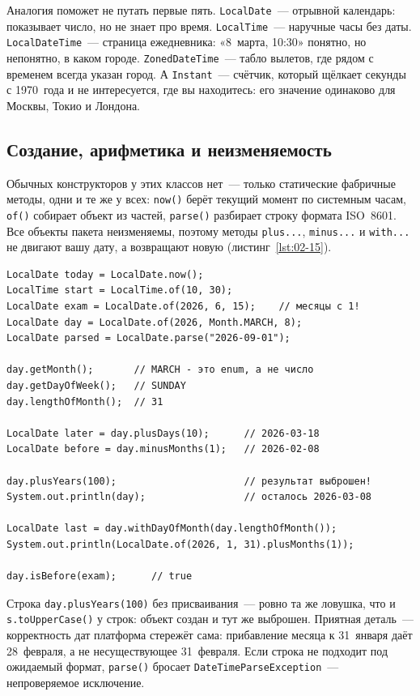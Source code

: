 Аналогия поможет не путать первые пять. \texttt{LocalDate}~--- отрывной
календарь: показывает число, но не знает про время. \texttt{LocalTime}~---
наручные часы без даты. \texttt{LocalDateTime}~--- страница ежедневника:
«8~марта, 10:30» понятно, но непонятно, в каком городе.
\texttt{ZonedDateTime}~--- табло вылетов, где рядом с временем всегда указан
город. А \texttt{Instant}~--- счётчик, который щёлкает секунды с 1970~года и
не интересуется, где вы находитесь: его значение одинаково для Москвы, Токио
и Лондона.

\subsection{Создание, арифметика и неизменяемость}

Обычных конструкторов у этих классов нет~--- только статические фабричные
методы, одни и те же у всех: \texttt{now()} берёт текущий момент по системным
часам, \texttt{of()} собирает объект из частей, \texttt{parse()} разбирает
строку формата ISO~8601. Все объекты пакета неизменяемы, поэтому методы
\texttt{plus...}, \texttt{minus...} и \texttt{with...} не двигают вашу дату,
а возвращают новую (листинг~\ref{lst:02-15}).

\begin{listing}[H]
\begin{verbatim}
LocalDate today = LocalDate.now();
LocalTime start = LocalTime.of(10, 30);
LocalDate exam = LocalDate.of(2026, 6, 15);    // месяцы с 1!
LocalDate day = LocalDate.of(2026, Month.MARCH, 8);
LocalDate parsed = LocalDate.parse("2026-09-01");

day.getMonth();       // MARCH - это enum, а не число
day.getDayOfWeek();   // SUNDAY
day.lengthOfMonth();  // 31

LocalDate later = day.plusDays(10);      // 2026-03-18
LocalDate before = day.minusMonths(1);   // 2026-02-08

day.plusYears(100);                      // результат выброшен!
System.out.println(day);                 // осталось 2026-03-08

LocalDate last = day.withDayOfMonth(day.lengthOfMonth());
System.out.println(LocalDate.of(2026, 1, 31).plusMonths(1));

day.isBefore(exam);      // true
\end{verbatim}
\caption{Создание дат и арифметика над ними}
\label{lst:02-15}
\end{listing}

Строка \texttt{day.plusYears(100)} без присваивания~--- ровно та же ловушка,
что и \texttt{s.toUpperCase()} у строк: объект создан и тут же выброшен.
Приятная деталь~--- корректность дат платформа стережёт сама: прибавление
месяца к 31~января даёт 28~февраля, а не несуществующее 31~февраля. Если строка
не подходит под ожидаемый формат, \texttt{parse()} бросает
\texttt{DateTimeParseException}~--- непроверяемое исключение.

